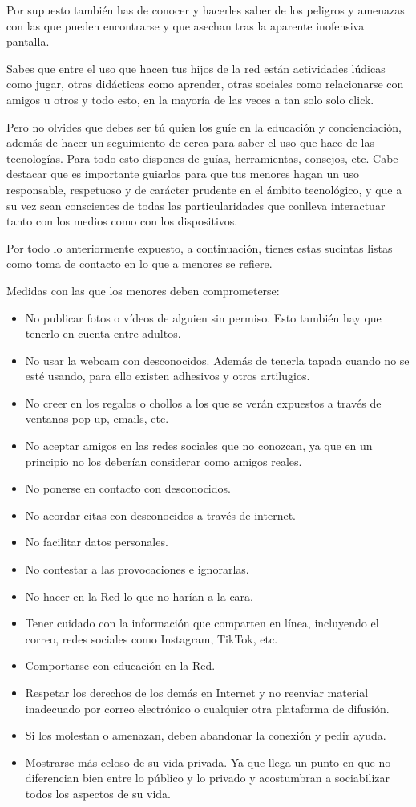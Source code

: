 \documentclass[
  spanish,
  a4paper,
  openany]{book}
\begin{document}
Por supuesto también has de conocer y hacerles saber de los peligros y amenazas con las que pueden encontrarse y que asechan tras la aparente inofensiva pantalla.

Sabes que entre el uso que hacen tus hijos de la red están actividades lúdicas como jugar, otras didácticas como aprender, otras sociales como relacionarse con amigos u otros y todo esto, en la mayoría de las veces a tan solo solo click.

Pero no olvides que debes ser tú quien los guíe en la educación y concienciación, además de hacer un seguimiento de cerca para saber el uso que hace de las tecnologías. Para todo esto dispones de guías, herramientas, consejos, etc. Cabe destacar que es importante guiarlos para que tus menores hagan un uso responsable, respetuoso y de carácter prudente en el ámbito tecnológico, y que a su vez sean conscientes de todas las particularidades que conlleva interactuar tanto con los medios como con los dispositivos.

Por todo lo anteriormente expuesto, a continuación, tienes estas sucintas listas como toma de contacto en lo que a menores se refiere.

Medidas con las que los menores deben comprometerse:

\begin{itemize}
\item
  No publicar fotos o vídeos de alguien sin permiso. Esto también hay que tenerlo en cuenta entre adultos.
\item
  No usar la webcam con desconocidos. Además de tenerla tapada cuando no se esté usando, para ello existen adhesivos y otros artilugios.
\item
  No creer en los regalos o chollos a los que se verán expuestos a través de ventanas pop-up, emails, etc.
\item
  No aceptar amigos en las redes sociales que no conozcan, ya que en un principio no los deberían considerar como amigos reales.
\item
  No ponerse en contacto con desconocidos.
\item
  No acordar citas con desconocidos a través de internet.
\item
  No facilitar datos personales.
\item
  No contestar a las provocaciones e ignorarlas.
\item
  No hacer en la Red lo que no harían a la cara.
\item
  Tener cuidado con la información que comparten en línea, incluyendo el correo, redes sociales como Instagram, TikTok, etc.
\item
  Comportarse con educación en la Red.
\item
  Respetar los derechos de los demás en Internet y no reenviar material inadecuado por correo electrónico o cualquier otra plataforma de difusión.
\item
  Si los molestan o amenazan, deben abandonar la conexión y pedir ayuda.
\item
  Mostrarse más celoso de su vida privada. Ya que llega un punto en que no diferencian bien entre lo público y lo privado y acostumbran a sociabilizar todos los aspectos de su vida.
\end{itemize}
\end{document}

